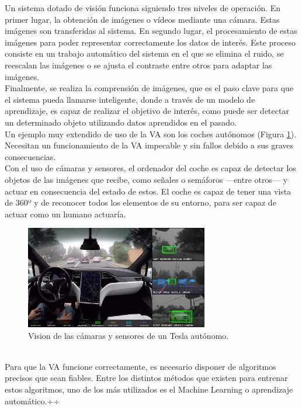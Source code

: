 Un sistema dotado de visión funciona siguiendo tres niveles de operación. En primer lugar, la obtención de imágenes o vídeos mediante una cámara. Estas imágenes son transferidas al sistema. En segundo lugar, el procesamiento de estas imágenes para poder representar correctamente los datos de interés. Este proceso consiste en un trabajo automático del sistema en el que se elimina el ruido, se reescalan las imágenes o se ajusta el contraste entre otros para adaptar las imágenes.\\ Finalmente, se realiza la comprensión de imágenes, que es el paso clave para que el sistema pueda llamarse inteligente, donde a través de un modelo de aprendizaje, es capaz de realizar el objetivo de interés, como puede ser detectar un determinado objeto utilizando datos aprendidos en el pasado.\\
Un ejemplo muy extendido de uso de la VA son los coches autónomos (Figura \ref{fig:tesla}). Necesitan un funcionamiento de la VA impecable y sin fallos debido a sus graves consecuencias.\\
Con el uso de cámaras y sensores, el ordenador del coche es capaz de detectar los objetos de las imágenes que recibe, como señales o semáforos ---entre otros--- y actuar en consecuencia del estado de estos. El coche es capaz de tener una vista de 360º y de reconocer todos los elementos de su entorno, para ser capaz de actuar como un humano actuaría.
\begin{figure} [h!]
  \begin{center}
    \includegraphics[width=8cm]{figs/coche_autonomo}
  \end{center}
  \caption[]{Vision de las cámaras y sensores de un Tesla autónomo. \footnotemark}
  \label{fig:tesla}
\end{figure}\\

Para que la VA funcione correctamente, es necesario disponer de algoritmos precisos que sean fiables. Entre los distintos métodos que existen para entrenar estos algoritmos, uno de los más utilizados es el Machine Learning o aprendizaje automático.÷÷

